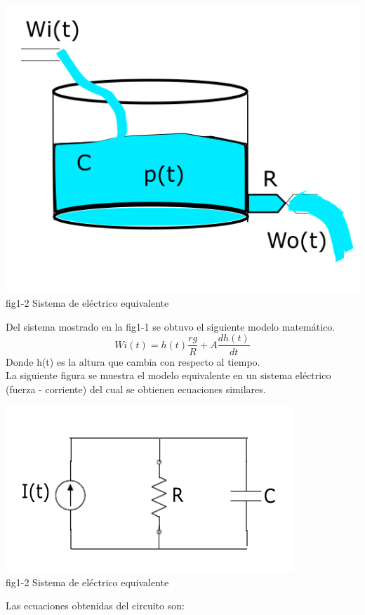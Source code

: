 \documentclass[12pt,a4paper]{IEEEtran}
\begin{document}
\begin{center}
	\includegraphics[scale = 0.5]{images/F1}\\
	{fig1-2 Sistema de eléctrico equivalente}
\end{center}


Del sistema mostrado en la fig1-1 se obtuvo el siguiente modelo matemático.
$$Wi(t) = h(t)\frac{rg}{R} + A\frac{dh(t)}{dt}$$
Donde h(t) es la altura que cambia con respecto al tiempo.
\\  
La siguiente figura se muestra el modelo equivalente en un sistema eléctrico (fuerza - corriente) del cual se obtienen ecuaciones similares.

\begin{center}
	\includegraphics[scale = 0.5]{images/RCI}\\
	{fig1-2 Sistema de eléctrico equivalente}
\end{center}

Las ecuaciones obtenidas del circuito son:
\end{document}

